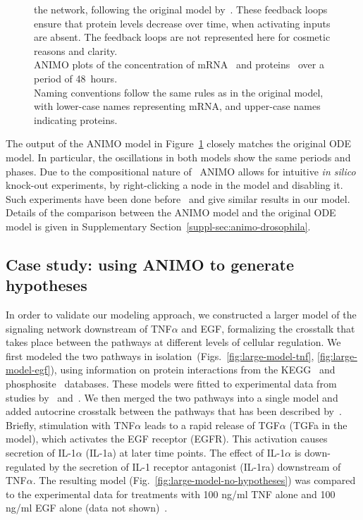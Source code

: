 \begin{figure}[!htpb]
{the network, following the original model by~\cite{drosophila-ode-model}. These feedback loops ensure that
protein levels decrease over time, when activating inputs are absent. The feedback loops are not represented here
for cosmetic reasons and clarity.\\%
ANIMO plots of the concentration of
mRNA~{\bfseries \protect{}}
and proteins~{\bfseries \protect{}} over a period of 48~hours.\\
Naming conventions follow the same rules
as in the original model, with lower-case names representing mRNA, and upper-case names indicating proteins.
}\label{fig:drosophila}
\end{figure}


The output of the ANIMO model in Figure~\ref{fig:drosophila} closely matches the original ODE model.
In particular, the oscillations in both models show the same periods and phases.
Due to the compositional nature of \tas\, ANIMO allows for intuitive \emph{in silico} knock-out experiments,
by right-clicking a node in the model and disabling it. Such experiments have been done
before~\citep{drosophila-ode-model} and give similar results in our model. Details of the comparison
between the ANIMO model and the original ODE model is given in Supplementary Section~\ref{suppl-sec:animo-drosophila}.



\subsection{Case study: using ANIMO to generate hypotheses}\label{subsec:case-study-larger}
In order to validate our modeling approach,
we constructed a larger model of the signaling network downstream of TNF$\alpha$ and EGF, formalizing
the crosstalk that takes place between the pathways at different levels of cellular regulation.
We first modeled the two pathways in isolation~(Figs.~\ref{fig:large-model-tnf}, \ref{fig:large-model-egf}),
using information on protein interactions from
the KEGG~\citep{kegg} and phosphosite~\citep{phosphosite} databases. These models were fitted to experimental data
from studies by~\citet{pathway-compendium} and~\citet{pathway-autocrine}.
We then merged the two pathways into a single model and added autocrine crosstalk between the pathways that has been
described by~\citet{pathway-autocrine}.
Briefly, stimulation with TNF$\alpha$ leads to a rapid release of TGF$\alpha$ ({\sf TGFa} in the model),
which activates the EGF receptor ({\sf EGFR}).
This activation causes secretion of IL-1$\alpha$ ({\sf IL-1a}) at later time points.
The effect of IL-1$\alpha$ is down-regulated by the secretion of IL-1 receptor antagonist ({\sf IL-1ra})
downstream of TNF$\alpha$.
The resulting model (Fig.~\ref{fig:large-model-no-hypotheses}) was compared to the experimental data
for treatments with 100 ng/ml TNF alone and 100 ng/ml EGF alone (data not shown)~\citep{pathway-compendium}.

